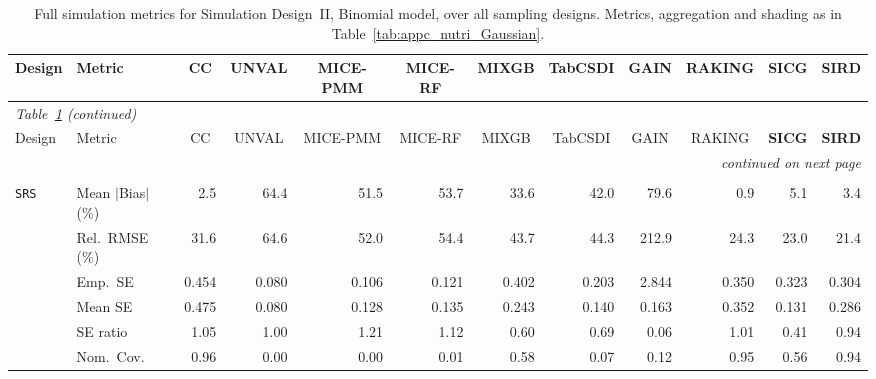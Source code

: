 \begin{landscape}
\footnotesize\setlength{\tabcolsep}{3.5pt}
\begin{longtable}{llrrrrrrrrrr}
\caption{Full simulation metrics for Simulation Design~II, Binomial model, over all sampling designs. Metrics, aggregation and shading as in Table~\ref{tab:appc_nutri_Gaussian}.}
\label{tab:appc_nutri_Binomial} \\
\toprule
Design & Metric & \multicolumn{1}{c}{CC} & \multicolumn{1}{c}{UNVAL} & \multicolumn{1}{c}{MICE-PMM} & \multicolumn{1}{c}{MICE-RF} & \multicolumn{1}{c}{MIXGB} & \multicolumn{1}{c}{TabCSDI} & \multicolumn{1}{c}{GAIN} & \multicolumn{1}{c}{RAKING} & \multicolumn{1}{c}{\textbf{SICG}} & \multicolumn{1}{c}{\textbf{SIRD}} \\
\midrule
\endfirsthead
\multicolumn{12}{l}{\footnotesize\itshape Table~\ref{tab:appc_nutri_Binomial} (continued)} \\
\toprule
Design & Metric & \multicolumn{1}{c}{CC} & \multicolumn{1}{c}{UNVAL} & \multicolumn{1}{c}{MICE-PMM} & \multicolumn{1}{c}{MICE-RF} & \multicolumn{1}{c}{MIXGB} & \multicolumn{1}{c}{TabCSDI} & \multicolumn{1}{c}{GAIN} & \multicolumn{1}{c}{RAKING} & \multicolumn{1}{c}{\textbf{SICG}} & \multicolumn{1}{c}{\textbf{SIRD}} \\
\midrule
\endhead
\midrule \multicolumn{12}{r}{\footnotesize\itshape continued on next page} \\
\endfoot
\bottomrule
\endlastfoot
\multicolumn{12}{l}{\textbf{Continuous Phase-Two Covariates}} \\
\addlinespace[2pt]
\quad \texttt{SRS} & Mean $|$Bias$|$ (\%) & \cellcolor{ranktwo}2.5 & 64.4 & 51.5 & 53.7 & 33.6 & 42.0 & 79.6 & \cellcolor{rankone}0.9 & 5.1 & \cellcolor{rankthree}3.4 \\
 & Rel.\ RMSE (\%) & 31.6 & 64.6 & 52.0 & 54.4 & 43.7 & 44.3 & 212.9 & \cellcolor{rankthree}24.3 & \cellcolor{ranktwo}23.0 & \cellcolor{rankone}21.4 \\
 & Emp.\ SE & 0.454 & 0.080 & 0.106 & 0.121 & 0.402 & 0.203 & 2.844 & 0.350 & 0.323 & 0.304 \\
 & Mean SE & 0.475 & 0.080 & 0.128 & 0.135 & 0.243 & 0.140 & 0.163 & 0.352 & 0.131 & 0.286 \\
 & SE ratio & \cellcolor{rankthree}1.05 & \cellcolor{rankone}1.00 & 1.21 & 1.12 & 0.60 & 0.69 & 0.06 & \cellcolor{ranktwo}1.01 & 0.41 & 0.94 \\
 & Nom.\ Cov. & \cellcolor{ranktwo}0.96 & 0.00 & 0.00 & 0.01 & \cellcolor{rankthree}0.58 & 0.07 & 0.12 & \cellcolor{rankone}0.95 & 0.56 & \cellcolor{ranktwo}0.94 \\

\end{longtable}
\end{landscape}
